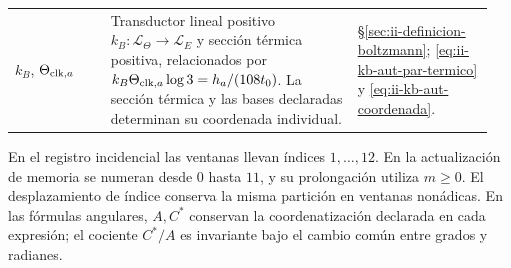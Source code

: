 \begin{longtable}{@{}>{\raggedright\arraybackslash}p{0.19\linewidth}
                    >{\raggedright\arraybackslash}p{0.49\linewidth}
                    >{\raggedright\arraybackslash}p{0.27\linewidth}@{}}
\(k_B\), \(\Theta_{{\rm clk},a}\)
& Transductor lineal positivo
  \(k_B:\mathcal L_\Theta\to\mathcal L_E\) y sección térmica
  positiva, relacionados por
  \(k_B\Theta_{{\rm clk},a}\log3=h_a/(108t_0)\).
  La sección térmica y las bases declaradas determinan su
  coordenada individual.
& \S\ref{sec:ii-definicion-boltzmann};
  \eqref{eq:ii-kb-aut-par-termico} y
  \eqref{eq:ii-kb-aut-coordenada}.\\

\end{longtable}
\endgroup

En el registro incidencial las ventanas llevan índices \(1,\ldots,12\).
En la actualización de memoria se numeran desde \(0\) hasta \(11\), y
su prolongación utiliza \(m\geq0\). El desplazamiento de índice conserva
la misma partición en ventanas nonádicas. En las fórmulas angulares,
\(A,C^*\) conservan la coordenatización declarada en cada expresión; el cociente
\(C^*/A\) es invariante bajo el cambio común entre grados y radianes.
